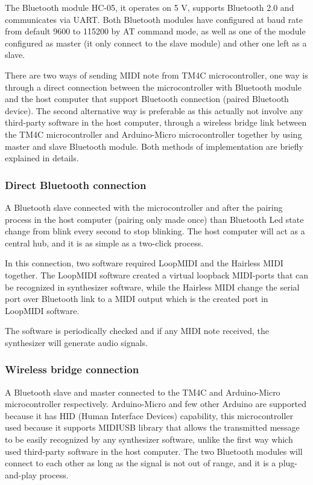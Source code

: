 \documentclass{article}
\begin{document}
The Bluetooth module HC-05, it operates on 5 V, supports Bluetooth 2.0 and communicates via UART. Both Bluetooth modules have configured at baud rate from default 9600 to 115200 by AT command mode, as well as one of the module configured as master (it only connect to the slave module) and other one left as a slave.

There are two ways of sending MIDI note from TM4C microcontroller, one way is through a direct connection between the microcontroller with Bluetooth module and the host computer that support Bluetooth connection (paired Bluetooth device). The second alternative way is preferable as this actually not involve any third-party software in the host computer, through a wireless bridge link between the TM4C microcontroller and Arduino-Micro microcontroller together by using master and slave Bluetooth module. Both methods of implementation are briefly explained in details.

\subsubsection{Direct Bluetooth connection}
A Bluetooth slave connected with the microcontroller and after the pairing process in the host computer (pairing only made once) than Bluetooth Led state change from blink every second to stop blinking. The host computer will act as a central hub, and it is as simple as a two-click process.

In this connection, two software required LoopMIDI \cite{loopmidi} and the Hairless MIDI \cite{hairlessmidiserial} together. The LoopMIDI software created a virtual loopback MIDI-ports that can be recognized in synthesizer software, while the Hairless MIDI change the serial port over Bluetooth link to a MIDI output which is the created port in LoopMIDI software. 

The software is periodically checked and if any MIDI note received, the synthesizer will generate audio signals.

\subsubsection{Wireless bridge connection}
A Bluetooth slave and master connected to the TM4C and Arduino-Micro microcontroller respectively. Arduino-Micro and few other Arduino are supported because it has HID (Human Interface Devices) capability, this microcontroller used because it supports MIDIUSB library \cite{arduinolibraries} that allows the transmitted message to be easily recognized by any synthesizer software, unlike the first way which used third-party software in the host computer. The two Bluetooth modules will connect to each other as long as the signal is not out of range, and it is a plug-and-play process.
\end{document}
